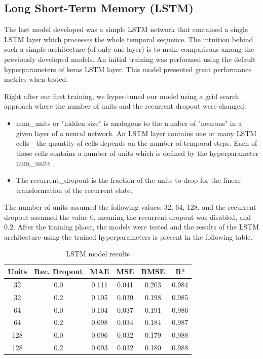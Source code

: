 \subsection{Long Short-Term Memory (LSTM)}
The last model developed was a simple LSTM network that contained a single LSTM layer which processes the whole temporal sequence. The intuition behind such a simple architecture (of only one layer) is to make comparisons among the previously developed models. An initial training was performed using the default hyperparameters of keras LSTM layer. This model presented great performance metrics when tested.

Right after our first training, we hyper-tuned our model using a grid search approach where the number of units and the recurrent dropout were changed:
\begin{itemize}
    \item num\_units or "hidden size" is analogous to the number of "neurons" in a given layer of a neural network. An LSTM layer contains one or many LSTM cells - the quantity of cells depends on the number of temporal steps. Each of those cells contains a number of units which is defined by the hyperparameter num\_units \cite{ref_num_units}.
    \item The recurrent\_dropout is the fraction of the units to drop for the linear transformation of the recurrent state.
\end{itemize}

The number of units assumed the following values: {32, 64, 128}, and the recurrent dropout assumed the value 0, meaning the recurrent dropout was disabled, and 0.2. After the training phase, the models were tested and the results of the LSTM architecture using the trained hyperparameters is present in the following table.

\begin{table}[H]
\centering
\caption{LSTM model results}
\begin{tabular}{||c|c|c|c|c|c||}
\hline
\textbf{Units} & \textbf{Rec. Dropout} & \textbf{MAE} & \textbf{MSE} & \textbf{RMSE} & \textbf{R²}\\
\hline
32 & 0.0 & 0.111 & 0.041 & 0.203 & 0.984 \\
\hline
32 & 0.2 & 0.105 & 0.039 & 0.198 & 0.985 \\
\hline
64 & 0.0 & 0.104 & 0.037 & 0.191 & 0.986 \\
\hline
64 & 0.2 & 0.098 & 0.034 & 0.184 & 0.987 \\
\hline
128 & 0.0 & 0.096 & 0.032 & 0.179 & 0.988 \\
\hline
128 & 0.2 & 0.093 & 0.032 & 0.180 & 0.988 \\
\hline
\end{tabular}
\label{tab:lstm_performance}
\end{table}

